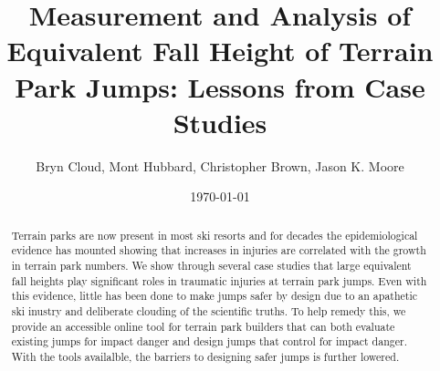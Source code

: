 \documentclass{article}
\title{Measurement and Analysis of Equivalent Fall Height of Terrain Park
  Jumps: Lessons from Case Studies}
\author{Bryn Cloud, Mont Hubbard, Christopher Brown, Jason K. Moore}
\date{\today}
\begin{document}
\maketitle

\begin{abstract}
  Terrain parks are now present in most ski resorts and for decades the
  epidemiological evidence has mounted showing that increases in injuries are
  correlated with the growth in terrain park numbers. We show through several
  case studies that large equivalent fall heights play significant roles in
  traumatic injuries at terrain park jumps. Even with this evidence, little has
  been done to make jumps safer by design due to an apathetic ski inustry and
  deliberate clouding of the scientific truths. To help remedy this, we provide
  an accessible online tool for terrain park builders that can both evaluate
  existing jumps for impact danger and design jumps that control for impact
  danger. With the tools availalble, the barriers to designing safer jumps is
  further lowered.
\end{abstract}
\end{document}
